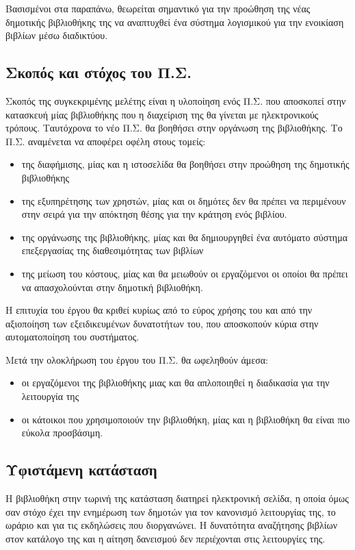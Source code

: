 \documentclass{assignment}
\begin{document}
Βασισμένοι στα παραπάνω, θεωρείται σημαντικό για την προώθηση της νέας δημοτικής βιβλιοθήκης της να αναπτυχθεί ένα σύστημα λογισμικού για την ενοικίαση βιβλίων μέσω διαδικτύου.

\subsection{Σκοπός και στόχος του Π.Σ.}

Σκοπός της συγκεκριμένης μελέτης είναι η υλοποίηση ενός Π.Σ. που αποσκοπεί στην κατασκευή μίας βιβλιοθήκης που η διαχείριση της θα γίνεται με ηλεκτρονικούς τρόπους. Ταυτόχρονα το νέο Π.Σ. θα βοηθήσει στην οργάνωση της βιβλιοθήκης. Το Π.Σ. αναμένεται να αποφέρει οφέλη στους τομείς:

\begin{itemize}
\item της διαφήμισης, μίας και η ιστοσελίδα θα βοηθήσει στην προώθηση της δημοτικής βιβλιοθήκης
\item της εξυπηρέτησης των χρηστών, μίας και οι δημότες δεν θα πρέπει να περιμένουν στην σειρά για την απόκτηση θέσης για την κράτηση ενός βιβλίου.
\item της οργάνωσης της βιβλιοθήκης, μίας και θα δημιουργηθεί ένα αυτόματο σύστημα επεξεργασίας της διαθεσιμότητας των βιβλίων
\item της μείωση του κόστους, μίας και θα μειωθούν οι εργαζόμενοι οι οποίοι θα πρέπει να απασχολούνται στην δημοτική βιβλιοθήκη. 
\end{itemize}

Η επιτυχία του έργου θα κριθεί κυρίως από το εύρος χρήσης του και από την αξιοποίηση των εξειδικευμένων δυνατοτήτων του, που αποσκοπούν κύρια στην αυτοματοποίηση του συστήματος.

Μετά την ολοκλήρωση του έργου του Π.Σ. θα ωφεληθούν άμεσα:

\begin{itemize}
\item οι εργαζόμενοι της βιβλιοθήκης μιας και θα απλοποιηθεί η διαδικασία για την λειτουργία της 
\item οι κάτοικοι που χρησιμοποιούν την βιβλιοθήκη, μίας και η βιβλιοθήκη θα είναι πιο εύκολα προσβάσιμη. 
\end{itemize}

\subsection{Υφιστάμενη κατάσταση}

Η βιβλιοθήκη στην τωρινή της κατάσταση διατηρεί ηλεκτρονική σελίδα, η οποία όμως σαν στόχο έχει την ενημέρωση των δημοτών για τον κανονισμό λειτουργίας της, το ωράριο και για τις εκδηλώσεις που διοργανώνει. Η δυνατότητα αναζήτησης βιβλίων στον κατάλογο της και η αίτηση δανεισμού δεν περιέχονται στις λειτουργίες της. 
\end{document}

